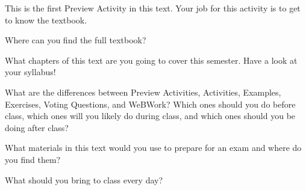 \begin{pa} \label{PA:0.1}
    This is the first Preview Activity in this text.  Your job for this activity is to get
    to know the textbook.
    \ba
    \item Where can you find the full textbook?  
    \item What chapters of this text are you going to cover this semester.  Have a look at
        your syllabus!
    \item What are the differences between Preview Activities, Activities, Examples,
        Exercises, Voting Questions, and WeBWork?  Which ones should you do before class,
        which ones will you likely do during class, and which ones should you be doing
        after class?
    \item What materials in this text would you use to prepare for an exam and where do
        you find them?
    \item What should you bring to class every day?
    \ea
\end{pa} \afterpa
